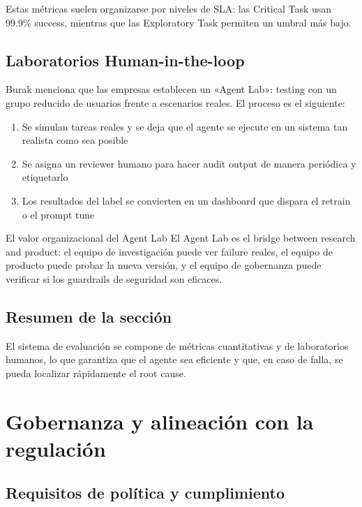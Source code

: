 \documentclass[a4paper]{article}
\begin{document}
Estas métricas suelen organizarse por niveles de SLA: las Critical Task usan 99.9\% success, mientras que las Exploratory Task permiten un umbral más bajo.

\subsection{Laboratorios Human-in-the-loop}

Burak menciona que las empresas establecen un «Agent Lab»: testing con un grupo reducido de usuarios frente a escenarios reales. El proceso es el siguiente:

\begin{enumerate}
    \item Se simulan tareas reales y se deja que el agente se ejecute en un sistema tan realista como sea posible
    \item Se asigna un reviewer humano para hacer audit output de manera periódica y etiquetarlo
    \item Los resultados del label se convierten en un dashboard que dispara el retrain o el prompt tune
\end{enumerate}

\begin{knowledgebox}{El valor organizacional del Agent Lab}
El Agent Lab es el bridge between research and product: el equipo de investigación puede ver failure reales, el equipo de producto puede probar la nueva versión, y el equipo de gobernanza puede verificar si los guardrails de seguridad son eficaces.
\end{knowledgebox}

\subsection{Resumen de la sección}

El sistema de evaluación se compone de métricas cuantitativas y de laboratorios humanos, lo que garantiza que el agente sea eficiente y que, en caso de falla, se pueda localizar rápidamente el root cause.

\section{Gobernanza y alineación con la regulación}

\subsection{Requisitos de política y cumplimiento}
\end{document}
